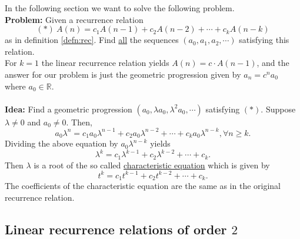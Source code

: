 In the following section we want to solve the following problem.\\
\textbf{Problem:} Given a recurrence relation
$$
(*)\ A(n)=c_1A(n-1)+c_2A(n-2)+\cdots+c_kA(n-k)
$$
as in definition \ref{defn:rec}. Find \underline{all} the sequences $(a_0, a_1, a_2, \cdots)$ satisfying this relation.
\\
For $k=1$ the linear recurrence relation yields $A(n)=c \cdot A(n-1)$, and the answer for our problem is just the geometric progression 
given by $a_n=c^n a_0$ where $a_0 \in \mathbb{R}$.
\\
\\
\noindent
\textbf{Idea:} Find a geometric progression $(a_0, \lambda a_0, \lambda^2 a_0, \cdots)$ satisfying $(*)$. Suppose $\lambda \neq 0$ and $a_0 \neq 0$.
Then,
$$
a_0 \lambda^n=c_1 a_0 \lambda^{n-1}+c_2 a_0 \lambda^{n-2} + \cdots + c_k a_0 \lambda^{n-k}, \forall n \geq k.
$$
Dividing the above equation by $a_0 \lambda^{n-k}$ yields 
$$
\lambda^k=c_1 \lambda^{k-1} + c_2 \lambda^{k-2} + \cdots + c_k.
$$
Then $\lambda$ is a root of the so called \underline{characteristic equation} which is given by
$$
t^k=c_1t^{k-1}+c_2 t^{k-2} + \cdots + c_k.
$$
The coefficients of the characteristic equation are the same as in the original recurrence relation.

\subsection{Linear recurrence relations of order $2$}

